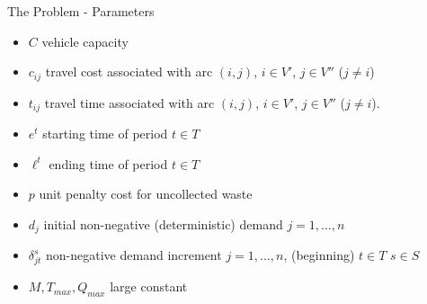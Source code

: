 \documentclass{beamer} %
\theoremstyle{definition} %
\begin{document}
\begin{frame}{The Problem - Parameters}
	\begin{itemize}
		\item[]  $C$ \quad   vehicle capacity \\
		\item[] $c_{ij}$ \quad travel cost associated with arc $(i,j)$, $i\in V'$, $j\in V''$ ($j \neq i$) \\
		\item[] $t_{ij}$  \quad travel time associated with arc $(i,j)$, $i\in V'$, $j\in V''$ ($j \neq i$). \\
		\item[] $e^t$  \quad starting time of period $t\in T$ \\
		\item[] $\ell^t$ \quad ending time of period $t\in T$ \\
		\item[] $p$  \quad unit penalty cost for uncollected waste\\
		\item[] $d_j$ \quad initial non-negative (deterministic) demand  $j=1,...,n$ \\
		\item[] $\delta_{jt}^s$  \quad non-negative demand increment $j=1,...,n$, (beginning) $t\in T$  $s \in S$ \\
		\item[] $M, T_{max}, Q_{max}$  \quad large constant \\
	\end{itemize}


	\end{frame}
\end{document}
